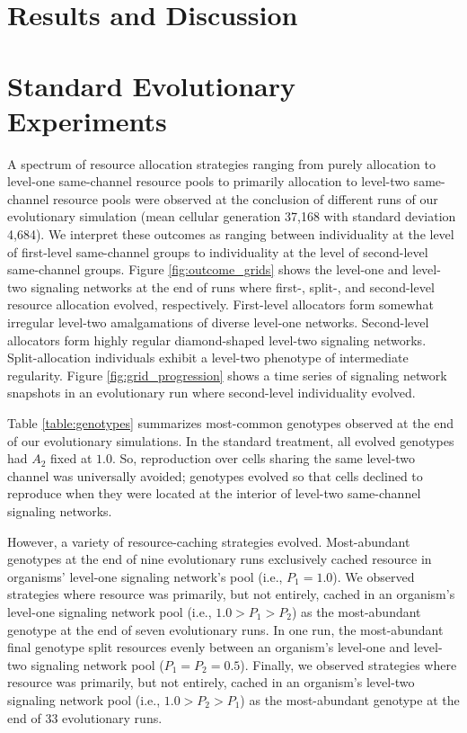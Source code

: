\section{Results and Discussion}

\section{Standard Evolutionary Experiments}







A spectrum of resource allocation strategies ranging from purely allocation to level-one same-channel resource pools to primarily allocation to level-two same-channel resource pools were observed at the conclusion of different runs of our evolutionary simulation (mean cellular generation 37,168 with standard deviation 4,684).
We interpret these outcomes as ranging between individuality at the level of first-level same-channel groups to individuality at the level of second-level same-channel groups.
Figure \ref{fig:outcome_grids} shows the level-one and level-two signaling networks at the end of runs where first-, split-, and second-level resource allocation evolved, respectively.
First-level allocators form somewhat irregular level-two amalgamations of diverse level-one networks.
Second-level allocators form highly regular diamond-shaped level-two signaling networks.
Split-allocation individuals exhibit a level-two phenotype of intermediate regularity.
Figure \ref{fig:grid_progression} shows a time series of signaling network snapshots in an evolutionary run where second-level individuality evolved.

Table \ref{table:genotypes} summarizes most-common genotypes observed at the end of our evolutionary simulations.
In the standard treatment, all evolved genotypes had $A_2$ fixed at $1.0$.
So, reproduction over cells sharing the same level-two channel was universally avoided;
genotypes evolved so that cells declined to reproduce when they were located at the interior of level-two same-channel signaling networks.

However, a variety of resource-caching strategies evolved.
Most-abundant genotypes at the end of nine evolutionary runs exclusively cached resource in organisms' level-one signaling network's pool (i.e., $P_1 = 1.0$).
We observed strategies where resource was primarily, but not entirely, cached in an organism's level-one signaling network pool (i.e., $1.0 > P_1 > P_2$) as the most-abundant genotype at the end of seven evolutionary runs.
In one run, the most-abundant final genotype split resources evenly between an organism's level-one and level-two signaling network pool ($P_1 = P_2 = 0.5$).
Finally, we observed strategies where resource was primarily, but not entirely, cached in an organism's level-two signaling network pool (i.e., $1.0 > P_2 > P_1$) as the most-abundant genotype at the end of 33 evolutionary runs.

